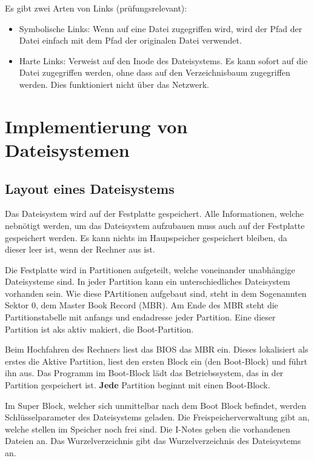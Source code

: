 Es gibt zwei Arten von Links (prüfungsrelevant):

\begin{itemize}
    \item Symbolische Links: Wenn auf eine Datei zugegriffen wird, wird der Pfad der Datei einfach mit dem Pfad der originalen Datei verwendet.
    \item Harte Links: Verweist auf den Inode des Dateisystems. Es kann sofort auf die Datei zugegriffen werden, ohne dass auf den Verzeichnisbaum zugegriffen werden. Dies funktioniert nicht über das Netzwerk.
\end{itemize}

\section{Implementierung von Dateisystemen}

\subsection{Layout eines Dateisystems}

Das Dateisystem wird auf der Festplatte gespeichert. Alle Informationen, welche nebnötigt werden, um das Dateisystem aufzubauen muss auch auf der Festplatte gespeichert werden. Es kann nichts im Haupspeicher gespeichert bleiben, da dieser leer ist, wenn der Rechner aus ist.

Die Festplatte wird in Partitionen aufgeteilt, welche voneinander unabhängige Dateisysteme sind. In jeder Partition kann ein unterschiedliches Dateisystem vorhanden sein. Wie diese PArtitionen aufgebaut sind, steht in dem Sogenannten Sektor 0, dem Master Book Record (MBR). Am Ende des MBR steht die Partitionstabelle mit anfangs und endadresse jeder Partition. Eine dieser Partition ist aks aktiv makiert, die Boot-Partition.

Beim Hochfahren des Rechners liest das BIOS das MBR ein. Dieses lokalisiert als erstes die Aktive Partition, liest den ersten Block ein (den Boot-Block) und führt ihn aus. Das Programm im Boot-Block lädt das Betriebssystem, das in der Partition gespeichert ist. \textbf{Jede} Partition beginnt mit einen Boot-Block.

Im Super Block, welcher sich unmittelbar nach dem Boot Block befindet, werden Schlüsselparameter des Dateisystems geladen. Die Freispeicherverwaltung gibt an, welche stellen im Speicher noch frei sind. Die I-Notes geben die vorhandenen Dateien an. Das Wurzelverzeichnis gibt das Wurzelverzeichnis des Dateisystems an.

